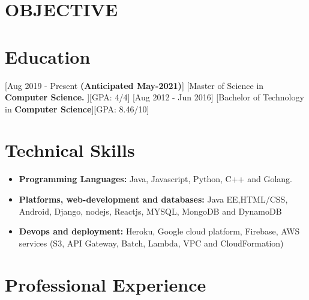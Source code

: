 \documentclass{article}
\begin{document}

\makecvtitle %
\section{OBJECTIVE}
\section{Education}
[\normalfont{}Aug 2019 - Present \textbf{(Anticipated May-2021)}]
[\normalfont{}Master of Science in \textbf{Computer Science. }][GPA: 4/4]
\vspace{0.1cm}
[\normalfont{}Aug 2012 - Jun 2016]
[\normalfont{}Bachelor of Technology in \textbf{Computer Science}][GPA: 8.46/10]
\vspace{0.5cm}
\section{Technical Skills}
\begin{itemize}
\item \textbf{Programming Languages:} Java, Javascript, Python, C++ and Golang.
\item \textbf{Platforms, web-development and databases:} Java EE,HTML/CSS, Android, Django, nodejs, Reactjs, MYSQL, MongoDB and DynamoDB
\item \textbf{Devops and deployment:} Heroku, Google cloud platform, Firebase, AWS services (S3, API Gateway, Batch, Lambda, VPC and CloudFormation)
\end{itemize}
 
\vspace{0.5cm}
\section{Professional Experience}
\end{document}
